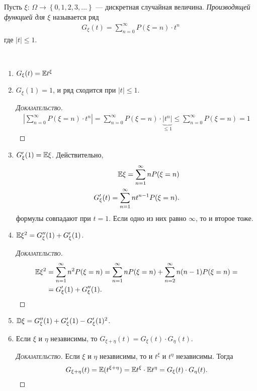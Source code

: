 \documentclass[../main.tex]{subfiles}
\begin{document}
\begin{df}
 Пусть $ \xi \colon\, \Omega \to \left\{ 0, 1, 2, 3, \ldots \right\} $ --- дискретная случайная величина. \textit{Производящей функцией для $ \xi $} называется ряд
 \begin{align*}
  G_\xi(t) = \sum_{n=0}^{\infty}P(\xi = n) \cdot t^{n}
 \end{align*} где $ \left| t \right| \leqslant 1 $.
\end{df}

\begin{prop}\
 \begin{enumerate}
  \item $G_\xi(t) = \mathbb E t^{\xi}$
  \item $ G_\xi(1) = 1 $, и ряд сходится при $ \left| t \right| \leqslant 1 $.
	  \begin{proof}[\normalfont\textsc{Доказательство}]
	  	\begin{align*}
			\left| \sum_{n = 0}^\infty P(\xi = n) \cdot t^{n} \right| = \sum_{n = 0}^\infty P(\xi = n) \cdot \underbrace{|t^{n}|}_{\leq 1} \leqslant \sum_{n = 0}^\infty P(\xi = n) = 1
	  	\end{align*}
	  \end{proof}
  \item $ G'_\xi(1) = \mathbb E \xi $. Действительно,
   \begin{align*}
    \mathbb E \xi = \sum_{n=1}^{\infty} n P(\xi = n) \\
    G'_\xi(t) = \sum_{n=1}^{\infty} nt^{n-1} P(\xi = n).
   \end{align*} формулы совпадают при $ t = 1 $. Если одно из них равно $ \infty $, то и второе тоже.
  \item $ \mathbb E\xi^{2} = G''_\xi(1) + G'_\xi(1) $.
   \begin{proof}[\normalfont\textsc{Доказательство}]
    \begin{align*}
     \mathbb E\xi^{2} &= \sum_{n=1}^{\infty} n^{2}P(\xi = n) = \sum_{n=1}^{\infty} nP(\xi=n) + \sum_{n=2}^{\infty} n(n-1)P(\xi = n) = \\
     &= G'_\xi(1) + G''_\xi(1).
    \end{align*}
   \end{proof}
  \item $ \mathbb D\xi = G''_\xi(1) + G'_\xi(1) - G'_\xi(1)^{2} $.
  \item Если $ \xi $ и $ \eta $ независимы, то $ G_{\xi + \eta}(t) = G_{\xi}(t) \cdot G_\eta(t) $.
   \begin{proof}[\normalfont\textsc{Доказательство}]
    Если $ \xi $ и $ \eta $ независимы, то и $ t^{\xi}  $ и $ t^{\eta} $ независимы. Тогда
    \begin{align*}
     G_{\xi+\eta}(t) = \mathbb E(t^{\xi+\eta}) = \mathbb E t^{\xi} \cdot \mathbb E t^{\eta} = G_\xi(t) \cdot G_\eta(t).
    \end{align*}
   \end{proof}
 \end{enumerate}
\end{prop}
\end{document}

